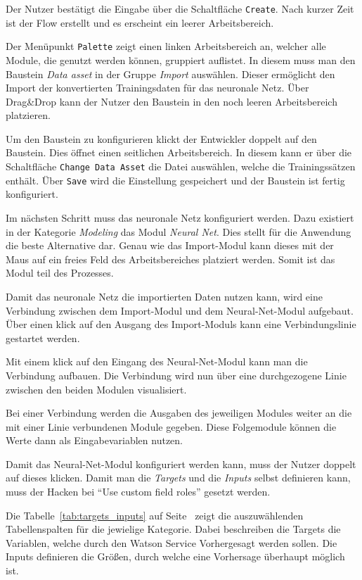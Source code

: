 Der Nutzer bestätigt die Eingabe über die Schaltfläche \texttt{Create}. Nach kurzer Zeit ist der Flow erstellt und es
erscheint ein leerer Arbeitsbereich.

Der Menüpunkt \texttt{Palette} zeigt einen linken Arbeitsbereich an, welcher alle Module, die genutzt werden können,
gruppiert auflistet. In diesem muss man den Baustein \textit{Data asset} in der Gruppe \textit{Import} auswählen. Dieser
ermöglicht den Import der konvertierten Trainingsdaten für das neuronale Netz. Über Drag\&Drop kann der Nutzer den
Baustein in den noch leeren Arbeitsbereich platzieren.

Um den Baustein zu konfigurieren klickt der Entwickler doppelt auf den Baustein. Dies öffnet einen seitlichen
Arbeitsbereich. In diesem kann er über die Schaltfläche \texttt{Change Data Asset} die Datei auswählen, welche die
Trainingssätzen enthält. Über \texttt{Save} wird die Einstellung gespeichert und der Baustein ist fertig konfiguriert.

Im nächsten Schritt muss das neuronale Netz konfiguriert werden. Dazu existiert in der Kategorie \textit{Modeling} das
Modul \textit{Neural Net}. Dies stellt für die Anwendung die beste Alternative dar. Genau wie das Import-Modul kann dieses
mit der Maus auf ein freies Feld des Arbeitsbereiches platziert werden. Somit ist das Modul teil des Prozesses.

Damit das neuronale Netz die importierten Daten nutzen kann, wird eine Verbindung zwischen dem Import-Modul und dem
Neural-Net-Modul aufgebaut. Über einen klick auf den Ausgang des Import-Moduls kann eine Verbindungslinie gestartet werden.

Mit einem klick auf den Eingang des Neural-Net-Modul kann man die Verbindung aufbauen. Die Verbindung wird nun über eine
durchgezogene Linie zwischen den beiden Modulen visualisiert.

Bei einer Verbindung werden die Ausgaben des jeweiligen Modules weiter an die mit einer Linie verbundenen Module
gegeben. Diese Folgemodule können die Werte dann als Eingabevariablen nutzen.

Damit das Neural-Net-Modul konfiguriert werden kann, muss der Nutzer doppelt auf dieses klicken. Damit man die
\textit{Targets} und die \textit{Inputs} selbst definieren kann, muss der Hacken bei \enquote{Use custom field roles}
gesetzt werden.

Die Tabelle~\ref{tab:targets_inputs} auf Seite~\pageref{tab:targets_inputs} zeigt die auszuwählenden Tabellenspalten für
die jewielige Kategorie. Dabei beschreiben die Targets die Variablen, welche durch den Watson Service Vorhergesagt werden
sollen. Die Inputs definieren die Größen, durch welche eine Vorhersage überhaupt möglich ist.

